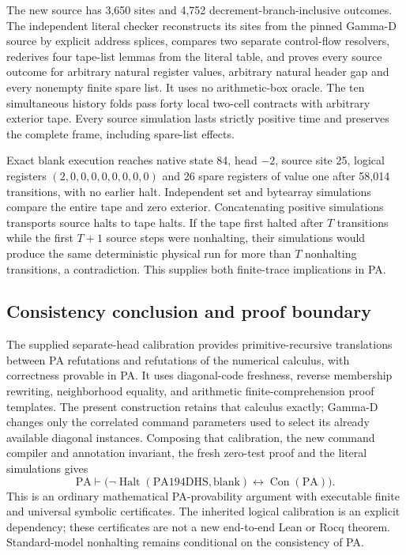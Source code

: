 The new source has 3,650 sites and 4,752 decrement-branch-inclusive
outcomes. The independent literal checker reconstructs its sites from
the pinned Gamma-D source by explicit address splices, compares two
separate control-flow resolvers, rederives four tape-list lemmas from the
literal table, and proves every source outcome for arbitrary natural
register values, arbitrary natural header gap and every nonempty finite
spare list. It uses no arithmetic-box oracle. The ten simultaneous
history folds pass forty local two-cell contracts with arbitrary exterior
tape. Every source simulation lasts strictly positive time and preserves
the complete frame, including spare-list effects.

Exact blank execution reaches native state 84, head $-2$, source site 25,
logical registers $(2,0,0,0,0,0,0,0,0)$ and 26 spare registers of value one
after 58,014 transitions, with no earlier halt. Independent set and
bytearray simulations compare the entire tape and zero exterior.
Concatenating positive simulations transports source halts to tape halts.
If the tape first halted after $T$ transitions while the first $T+1$
source steps were nonhalting, their simulations would produce the same
deterministic physical run for more than $T$ nonhalting transitions,
a contradiction. This supplies both finite-trace implications in PA.

\subsection{Consistency conclusion and proof boundary}

The supplied separate-head calibration provides primitive-recursive
translations between PA refutations and refutations of the numerical
calculus, with correctness provable in PA. It uses diagonal-code freshness,
reverse membership rewriting, neighborhood equality, and arithmetic
finite-comprehension proof templates. The present construction retains
that calculus exactly; Gamma-D changes only the correlated command
parameters used to select its already available diagonal instances.
Composing that calibration, the new command compiler and annotation
invariant, the fresh zero-test proof and the literal simulations gives
\[
 \mathrm{PA}\vdash
 \bigl(\neg\operatorname{Halt}(\mathrm{PA194DHS},\mathrm{blank})
             \leftrightarrow\operatorname{Con}(\mathrm{PA})\bigr).
\]
This is an ordinary mathematical PA-provability argument with executable
finite and universal symbolic certificates. The inherited logical
calibration is an explicit dependency; these certificates are not a
new end-to-end Lean or Rocq theorem. Standard-model nonhalting remains
conditional on the consistency of PA.
